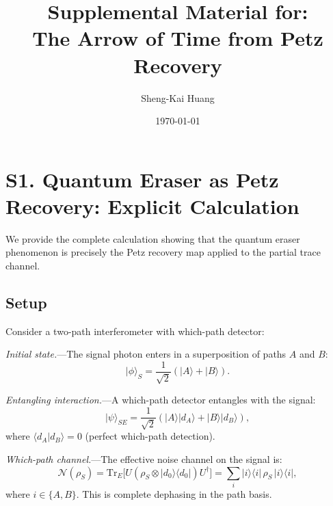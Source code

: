 \documentclass[prl,twocolumn,superscriptaddress,longbibliography]{revtex4-2}
\newcommand{\Tr}{\mathrm{Tr}}
\newcommand{\chan}{\mathcal{N}}
\newcommand{\ket}[1]{|#1\rangle}
\newcommand{\bra}[1]{\langle#1|}
\newcommand{\braket}[2]{\langle#1|#2\rangle}
\begin{document}
\title{Supplemental Material for:\\
The Arrow of Time from Petz Recovery}

\author{Sheng-Kai Huang}

\date{\today}

\maketitle

\section{S1. Quantum Eraser as Petz Recovery: Explicit Calculation}
\label{sec:eraser_calc}

We provide the complete calculation showing that the quantum eraser
phenomenon is precisely the Petz recovery map applied to the partial
trace channel.

\subsection{Setup}

Consider a two-path interferometer with which-path detector:

\emph{Initial state.}---The signal photon enters in a superposition of
paths $A$ and $B$:
\begin{equation}
\ket{\phi}_S = \frac{1}{\sqrt{2}}(\ket{A} + \ket{B}).
\end{equation}

\emph{Entangling interaction.}---A which-path detector entangles with the
signal:
\begin{equation}
\ket{\psi}_{SE} = \frac{1}{\sqrt{2}}(\ket{A}\ket{d_A}
  + \ket{B}\ket{d_B}),
\label{eq:entangled}
\end{equation}
where $\braket{d_A}{d_B} = 0$ (perfect which-path detection).

\emph{Which-path channel.}---The effective noise channel on the signal
is:
\begin{equation}
\chan(\rho_S) = \Tr_E\!\big[U(\rho_S \otimes \ket{d_0}\bra{d_0})U^\dagger
\big] = \sum_i \ket{i}\bra{i}\,\rho_S\,\ket{i}\bra{i},
\end{equation}
where $i \in \{A,B\}$. This is complete dephasing in the path basis.
\end{document}

